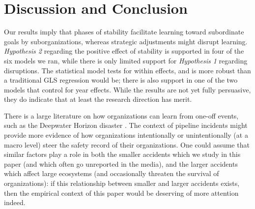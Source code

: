 \section{Discussion and Conclusion}
Our results imply that phases of stability facilitate learning toward subordinate goals by suborganizations, whereas strategic adjustments might disrupt learning. \textit{Hypothesis 2} regarding the positive effect of stability is supported in four of the six models we ran, while there is only limited support for \textit{Hypothesis 1} regarding disruptions. The statistical model tests for within effects, and is more robust than a traditional GLS regression would be; there is also support in one of the two models that control for year effects. While the results are not yet fully persuasive, they do indicate that at least the research direction has merit. 

There is a large literature on how organizations can learn from one-off events, such as the Deepwater Horizon disaster \citep[e.g.,][]{March1991, Haunschild2015}. The context of pipeline incidents might provide more evidence of how organizations intentionally or unintentionally (at a macro level) steer the safety record of their organizations. One could assume that similar factors play a role in both the smaller accidents which we study in this paper (and which often go unreported in the media), and the larger accidents which affect large ecosystems (and occasionally threaten the survival of organizations): if this relationship between smaller and larger accidents exists, then the empirical context of this paper would be deserving of more attention indeed.

